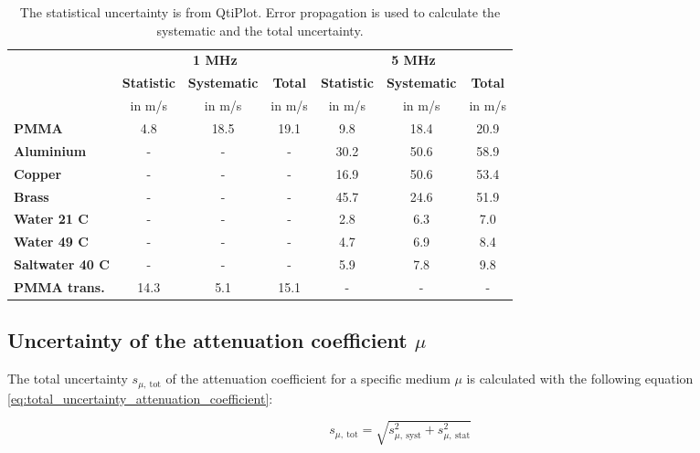 \begin{table}[H]
	\centering
	\renewcommand{\arraystretch}{1.1}
	\begin{tabular}{|l|c|c|c||c|c|c|}
		\cline{2-7}
		\multicolumn{1}{c|}{} & \multicolumn{3}{c||}{\textbf{1 MHz}} & \multicolumn{3}{c|}{\textbf{5 MHz}} \\
		\cline{2-7}
		\multicolumn{1}{c|}{} & \textbf{Statistic} & \textbf{Systematic} & \textbf{Total} & \textbf{Statistic} & \textbf{Systematic} & \textbf{Total} \\
		\multicolumn{1}{c|}{} & in m/s & in m/s & in m/s & in m/s & in m/s & in m/s \\
		\hline
		\textbf{PMMA} & 4.8 & 18.5 & 19.1 & 9.8 & 18.4 & 20.9 \\
		\hline
		\textbf{Aluminium} & - & - & - & 30.2 & 50.6 & 58.9 \\
		\hline
		\textbf{Copper} & - & - & - & 16.9 & 50.6 & 53.4 \\
		\hline
		\textbf{Brass} & - & - & - & 45.7 & 24.6 & 51.9 \\
		\hline
		\textbf{Water 21 \textdegree C} & - & - & - & 2.8 & 6.3 & 7.0 \\
		\hline
		\textbf{Water 49 \textdegree C} & - & - & - & 4.7 & 6.9 & 8.4 \\
		\hline
		\textbf{Saltwater 40 \textdegree C} & - & - & - & 5.9 & 7.8 & 9.8 \\
		\hline
		\textbf{PMMA trans.} & 14.3 & 5.1 & 15.1 & - & - & - \\
		\hline
	\end{tabular}
	\caption{The statistical uncertainty is from QtiPlot. Error propagation is used to calculate the systematic and the total uncertainty.}
	\label{tab:Uncertainty_Sound_Velocity}
\end{table}

\newpage
\subsection{Uncertainty of the attenuation coefficient $\mu$}
\label{subsec:Uncertainty_Attenuation_Coefficient}
The total uncertainty $s_{\mu,\ \text{tot}}$ of the attenuation coefficient for a specific medium $\mu$ is calculated with the following equation \ref{eq:total_uncertainty_attenuation_coefficient}:

\begin{equation}
s_{\mu,\ \text{tot}}=\sqrt{s_{\mu,\ \text{syst}}^2+s_{\mu,\ \text{stat}}^2}
\label{eq:total_uncertainty_attenuation_coefficient}
\end{equation}


